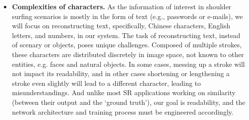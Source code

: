 \begin{itemize}[leftmargin=*]
  \item \textbf{Complexities of characters.} As the information of interest in shoulder surfing scenarios is mostly in the form of text (e.g., passwords or e-mails), we will focus on reconstructing text, specifically, Chinese characters, English letters, and numbers, in our system. The task of reconstructing text, instead of scenary or objects, poses unique challenges. Composed of multiple strokes, these characters are distributed discretely in image space, not known to other entities, e.g. faces and natural objects. In some cases, messing up a stroke will not impact its readability, and in other cases shortening or lengthening a stroke even slightly will lead to a different character, leading to misunderstandings. And unlike most SR applications working on similarity (between their output and the ‘ground truth’), our goal is readability, and the network architecture and training process must be engineered accordingly.
\end{itemize}
  


